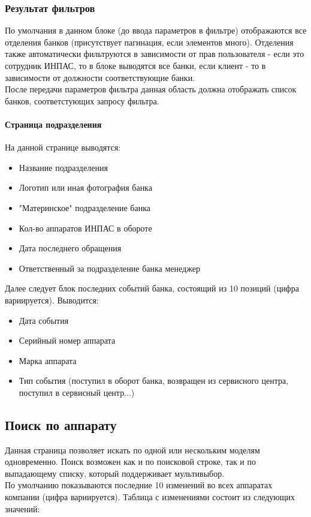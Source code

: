\documentclass[DIV=calc, paper=a4, fontsize=11pt]{scrartcl} %
\begin{document}
\subsubsection{Результат фильтров}
По умолчания в данном блоке (до ввода параметров в фильтре) отображаются все отделения банков (присутствует пагинация, если элементов много). Отделения также автоматически фильтруются в зависимости от прав пользователя - если это сотрудник ИНПАС, то в блоке выводятся все банки, если клиент - то в зависимости от должности соответствующие банки.
\\[0.5cm]
После передачи параметров фильтра данная область должна отображать список банков, соответстующих запросу фильтра.

\paragraph{Страница подразделения}
На данной странице выводятся:

\begin{itemize}
	\item Название подразделения
	\item Логотип или иная фотография банка
	\item "Материнское" подразделение банка
	\item Кол-во аппаратов ИНПАС в обороте
	\item Дата последнего обращения
	\item Ответственный за подразделение банка менеджер
\end{itemize}

Далее следует блок последних событий банка, состоящий из 10 позиций (цифра вариируется). Выводится:

\begin{itemize}
	\item Дата события
	\item Серийный номер аппарата
	\item Марка аппарата
	\item Тип события (поступил в оборот банка, возвращен из сервисного центра, поступил в сервисный центр...)
\end{itemize}

\subsection{Поиск по аппарату}
Данная страница позволяет искать по одной или нескольким моделям одновременно. Поиск возможен как и по поисковой строке, так и по выпадающему списку, который поддерживает мультивыбор.
\\[0.5cm]
По умолчанию показываются последние 10 изменений во всех аппаратах компании (цифра вариируется). Таблица с изменениями состоит из следующих значений:
\end{document}
